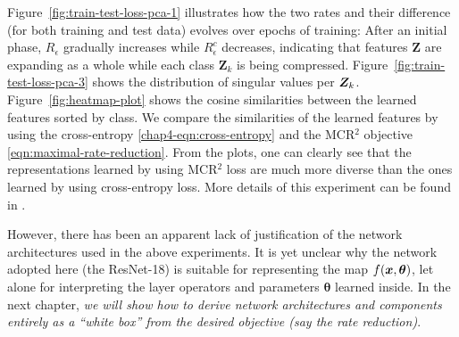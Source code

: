 \documentclass[../../book-main.tex]{subfiles}
\begin{document}
\begin{example}
	Figure~\ref{fig:train-test-loss-pca-1} illustrates how the two rates and their difference (for both training and test data) evolves over epochs of training: After an initial phase, $R_\epsilon$ gradually increases while $R^c_\epsilon$ decreases, indicating that features $\bm Z$ are expanding as a whole while each class $\bm Z_k$ is being compressed.
	Figure~\ref{fig:train-test-loss-pca-3} shows the distribution of singular values per $\bm{Z}_k$.  Figure~\ref{fig:heatmap-plot} shows the cosine similarities between the learned features sorted by class. We compare the similarities of the learned features by using the cross-entropy \eqref{chap4-eqn:cross-entropy} and the MCR$^2$ objective \eqref{eqn:maximal-rate-reduction}. From the plots, one can clearly see that the representations learned by using MCR$^2$ loss are much more diverse than the ones learned by using cross-entropy loss. More details of this experiment can be found in \cite{chan2021redunet}.
	\label{eg:Rate-Reduction-CIFAR10}
\end{example}


However, there has been an apparent lack of justification of the network architectures used in the above experiments. It is yet unclear why the network adopted here (the ResNet-18) is suitable for representing the map $f(\bm{x}, \bm \theta)$, let alone for interpreting the layer operators and parameters $\bm \theta$ learned inside. In the next chapter, {\em we will show how to derive network architectures and components entirely as a ``white box'' from the desired objective (say the rate reduction)}.
\end{document}
